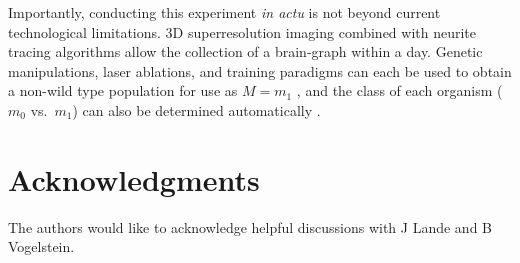 \documentclass{article}
\newcommand{\mB}{\mathcal{B}}
\newcommand{\mM}{\mathcal{M}}
\newcommand{\hL}{\widehat{L}}
\newcommand{\MeB}{\mM \overset{\varepsilon}{{\sim}}_F \mB}
\providecommand{\tr}[1]{\textcolor{black}{#1}}
\begin{document}
Importantly, conducting this experiment {\it in actu} is not beyond current technological limitations. 3D superresolution imaging \cite{VaziriShank08} combined with neurite tracing algorithms \cite{HelmstaedterDenk08,Mishchenko09,LuLichtman09} allow the collection of a brain-graph within a day. Genetic manipulations, laser ablations, and training paradigms can each be used to obtain a non-wild type population for use as $M=m_1$ \cite{deBonoMaricq05}, and the class of each organism ($m_0$ vs.~$m_1$) can also be determined automatically \cite{BuckinghamSattelle08}.


\section{Acknowledgments}

The authors would like to acknowledge helpful discussions with J Lande and B Vogelstein. 





% 
% 
\end{document}

